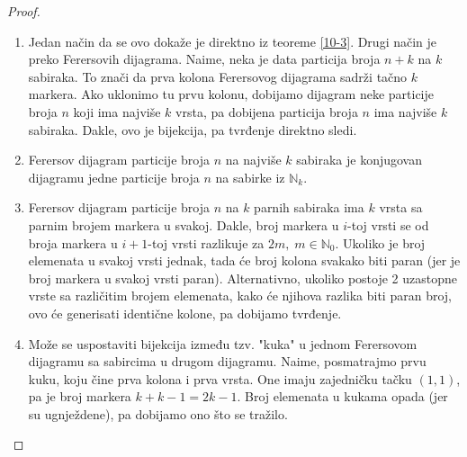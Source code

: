 \documentclass[a4paper,12pt]{article}
\numberwithin{algorithm}{section}
\theoremstyle{plain}
\theoremstyle{definition}
\theoremstyle{remark}
\begin{document}
\begin{proof}
    \begin{enumerate}
        \item Jedan način da se ovo dokaže je direktno iz teoreme \ref{10-3}. Drugi način je preko Ferersovih dijagrama. Naime, neka je data 
        particija broja $n + k$ na $k$ sabiraka. To znači da prva kolona Ferersovog dijagrama sadrži tačno $k$ markera. Ako uklonimo tu prvu kolonu, 
        dobijamo dijagram neke particije broja $n$ koji ima najviše $k$ vrsta, pa dobijena particija broja $n$ ima najviše $k$ sabiraka. Dakle, ovo je bijekcija,
        pa tvrđenje direktno sledi.
        \item Ferersov dijagram particije broja $n$ na najviše $k$ sabiraka je konjugovan dijagramu jedne particije broja $n$ na sabirke iz $\mathbb{N}_k$.
        \item Ferersov dijagram particije broja $n$ na $k$ parnih sabiraka ima $k$ vrsta sa parnim brojem markera u svakoj. Dakle, broj markera u $i$-toj vrsti se od broja markera u $i+1$-toj vrsti razlikuje za $2m, \;m\in \mathbb{N}_0$. Ukoliko je broj elemenata u svakoj vrsti jednak, tada će broj kolona svakako biti paran (jer je broj markera u svakoj vrsti paran). Alternativno, ukoliko postoje 2 uzastopne vrste sa različitim brojem elemenata, kako će njihova razlika biti paran broj, ovo će generisati identične kolone, pa dobijamo tvrđenje.
        \item Može se uspostaviti bijekcija između tzv. "kuka" u jednom Ferersovom dijagramu sa sabircima u drugom dijagramu. Naime, posmatrajmo prvu kuku, koju čine prva kolona i prva vrsta. One imaju zajedničku tačku $(1, 1)$, pa je broj markera $k + k - 1 = 2k-1$. Broj elemenata u kukama opada (jer su ugnježdene), pa dobijamo ono što se tražilo. 
    \end{enumerate}
\end{proof}

\newpage
\end{document}
